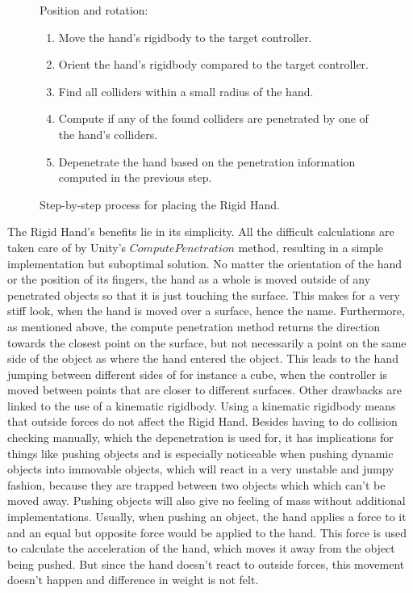 \begin{figure}[H]
\centering
\footnotesize
\begin{flushleft}
Position and rotation:
\end{flushleft}
\begin{enumerate}[noitemsep]
\item Move the hand's rigidbody to the target controller.
\item Orient the hand's rigidbody compared to the target controller.
\item Find all colliders within a small radius of the hand.
\item Compute if any of the found colliders are penetrated by one of the hand's colliders.
\item Depenetrate the hand based on the penetration information computed in the previous step.
\end{enumerate}
\caption{Step-by-step process for placing the Rigid Hand.}
\label{fig:stepByStepRigidHand}
\end{figure}

The Rigid Hand's benefits lie in its simplicity. All the difficult calculations are taken care of by Unity's $ComputePenetration$ method, resulting in a simple implementation but suboptimal solution. No matter the orientation of the hand or the position of its fingers, the hand as a whole is moved outside of any penetrated objects so that it is just touching the surface. This makes for a very stiff look, when the hand is moved over a surface, hence the name. Furthermore, as mentioned above, the compute penetration method returns the direction towards the closest point on the surface, but not necessarily a point on the same side of the object as where the hand entered the object. This leads to the hand jumping between different sides of for instance a cube, when the controller is moved between points that are closer to different surfaces. Other drawbacks are linked to the use of a kinematic rigidbody. Using a kinematic rigidbody means that outside forces do not affect the Rigid Hand. Besides having to do collision checking manually, which the depenetration is used for, it has implications for things like pushing objects and is especially noticeable when pushing dynamic objects into immovable objects, which will react in a very unstable and jumpy fashion, because they are trapped between two objects which which can't be moved away. Pushing objects will also give no feeling of mass without additional implementations. Usually, when pushing an object, the hand applies a force to it and an equal but opposite force would be applied to the hand. This force is used to calculate the acceleration of the hand, which moves it away from the object being pushed. But since the hand doesn't react to outside forces, this movement doesn't happen and difference in weight is not felt.

